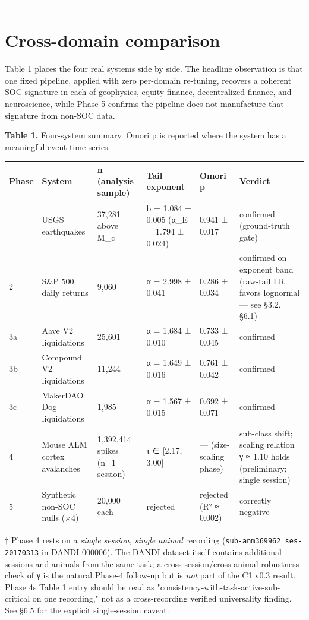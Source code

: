 \documentclass[
  11pt]{article}
\newcounter{none} %
\begin{document}
\begin{center}\rule{0.5\linewidth}{0.5pt}\end{center}

\section{Cross-domain comparison}\label{sec:4}

Table 1 places the four real systems side by side. The headline
observation is that one fixed pipeline, applied with zero per-domain
re-tuning, recovers a coherent SOC signature in each of geophysics,
equity finance, decentralized finance, and neuroscience, while Phase 5
confirms the pipeline does not manufacture that signature from non-SOC
data.

\textbf{Table 1.} Four-system summary. Omori p is reported where the
system has a meaningful event time series.

{\def\LTcaptype{none} %
\begin{longtable}[]{@{}llllll@{}}
\toprule\noalign{}
Phase & System & n (analysis sample) & Tail exponent & Omori p &
Verdict \\
\midrule\noalign{}
\endhead
\bottomrule\noalign{}
\endlastfoot
1 & USGS earthquakes & 37,281 above M\_c & b = 1.084 ± 0.005 (α\_E =
1.794 ± 0.024) & 0.941 ± 0.017 & confirmed (ground-truth gate) \\
2 & S\&P 500 daily returns & 9,060 & α = 2.998 ± 0.041 & 0.286 ± 0.034 &
confirmed on exponent band (raw-tail LR favors lognormal --- see §3.2,
§6.1) \\
3a & Aave V2 liquidations & 25,601 & α = 1.684 ± 0.010 & 0.733 ± 0.045 &
confirmed \\
3b & Compound V2 liquidations & 11,244 & α = 1.649 ± 0.016 & 0.761 ±
0.042 & confirmed \\
3c & MakerDAO Dog liquidations & 1,985 & α = 1.567 ± 0.015 & 0.692 ±
0.071 & confirmed \\
4 & Mouse ALM cortex avalanches & 1,392,414 spikes (n=1 session) † & τ ∈
{[}2.17, 3.00{]} & --- (size-scaling phase) & sub-class shift; scaling
relation γ ≈ 1.10 holds (preliminary; single session) \\
5 & Synthetic non-SOC nulls (×4) & 20,000 each & rejected & rejected (R²
≈ 0.002) & correctly negative \\
\end{longtable}
}

† Phase 4 rests on a \emph{single session, single animal} recording
(\texttt{sub-anm369962\_ses-20170313} in DANDI 000006). The DANDI
dataset itself contains additional sessions and animals from the same
task; a cross-session/cross-animal robustness check of γ is the natural
Phase-4 follow-up but is \emph{not} part of the C1 v0.3 result. Phase
4\textquotesingle s Table 1 entry should be read as
"consistency-with-task-active-sub-critical on one recording," not as a
cross-recording verified universality finding. See §6.5 for the explicit
single-session caveat.
\end{document}
